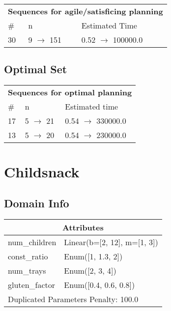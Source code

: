 \documentclass{article}
\begin{document}
                        \begin{center}
                        \begin{tabular}{l|l|l}
                        \multicolumn{3}{c}{\bf \large Sequences for agile/satisficing planning}\\
                        \# & n & Estimated Time\\\midrule
                        30&9 $\rightarrow$ 151&0.52 $\rightarrow$ 100000.0
                        \end{tabular}
                        \end{center}
                    
                            \subsection*{Optimal Set}

                            \begin{center}
                            \begin{tabular}{l|l|l}
                            \multicolumn{3}{c}{\bf \large Sequences for optimal planning}\\
                            \# & n & Estimated time\\\midrule
                            17&5 $\rightarrow$ 21&0.54 $\rightarrow$ 330000.0\\
13&5 $\rightarrow$ 20&0.54 $\rightarrow$ 230000.0
                            \end{tabular}
                            \end{center}
                    \newpage \section{Childsnack}
                    \subsection*{Domain Info}

                    \begin{center}
                    \begin{tabular}{p{}p{}}
                    \multicolumn{2}{c}{\bf \large Attributes}\\\midrule
                    num\_children & Linear(b=[2, 12], m=[1, 3])\\
const\_ratio & Enum([1, 1.3, 2])\\
num\_trays & Enum([2, 3, 4])\\
gluten\_factor & Enum([0.4, 0.6, 0.8])
                    
                     \\\midrule
                    \multicolumn{2}{l}{Duplicated Parameters Penalty: 100.0}
                    \end{tabular}
                    \end{center}
                
\end{document}
